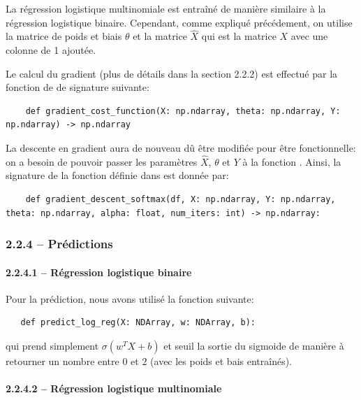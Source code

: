 \documentclass[
]{article}
\begin{document}
La régression logistique multinomiale est entraîné de manière similaire
à la régression logistique binaire. Cependant, comme expliqué
précédement, on utilise la matrice de poids et biais \(\theta\) et la
matrice \(\hat{X}\) qui est la matrice \(X\) avec une colonne de 1
ajoutée.

Le calcul du gradient (plus de détails dans la section 2.2.2) est
effectué par la fonction  de
 de signature suivante:

\begin{lstlisting}
    def gradient_cost_function(X: np.ndarray, theta: np.ndarray, Y: np.ndarray) -> np.ndarray
\end{lstlisting}

La descente en gradient aura de nouveau dû être modifiée pour être
fonctionnelle: on a besoin de pouvoir passer les paramètres \(\hat{X}\),
\(\theta\) et \(Y\) à la fonction .
Ainsi, la signature de la fonction 
définie dans  est donnée par:

\begin{lstlisting}
    def gradient_descent_softmax(df, X: np.ndarray, Y: np.ndarray, theta: np.ndarray, alpha: float, num_iters: int) -> np.ndarray:
\end{lstlisting}

\subsubsection{2.2.4 -- Prédictions}\label{pruxe9dictions}

\paragraph{2.2.4.1 -- Régression logistique
binaire}\label{ruxe9gression-logistique-binaire}

Pour la prédiction, nous avons utilisé la fonction suivante:

\begin{lstlisting}
   def predict_log_reg(X: NDArray, w: NDArray, b):
\end{lstlisting}

qui prend simplement \(\sigma(w^T X + b)\) et seuil la sortie du
sigmoide de manière à retourner un nombre entre 0 et 2 (avec les poids
et bais entraînés).

\paragraph{2.2.4.2 -- Régression logistique
multinomiale}\label{ruxe9gression-logistique-multinomiale}
\end{document}
